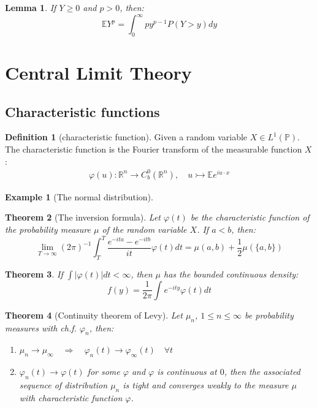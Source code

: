 \documentclass[a4paper,11pt]{book}
\newtheorem{theorem}{Theorem}[section]
\newtheorem{lemma}[theorem]{Lemma}
\theoremstyle{definition}
\newtheorem{definition}{Definition}[section]
\newtheorem*{example}{Example}
\theoremstyle{remark}
\begin{document}
\begin{lemma}
	If $Y\geq 0$ and $p >0$, then:
	\begin{equation*}
		\mathbb{E} Y^p = \int_{0}^\infty p y^{p-1} P(Y > y) dy
	\end{equation*}
\end{lemma}



\section{Central Limit Theory}
\subsection{Characteristic functions}
\begin{definition}[characteristic function]
	Given a random variable $X \in L^1(\mathbb{P}) $. The characteristic function is the Fourier transform of the measurable function $X$:
	\begin{align*}
		\varphi(u): \mathbb{R}^n \rightarrow C^0_b(\mathbb{R}^n), \quad u \rightarrowtail \mathbb{E}e^{iu \cdot x}
	\end{align*}
\end{definition}

\begin{example}[The normal distribution]
\end{example}



\begin{theorem}[The inversion formula]
	Let $\varphi(t)$ be the characteristic function of the probability measure $\mu$ of the random variable $X$. If $a<b$, then:
	\begin{equation*}
		\lim_{T \rightarrow \infty} (2\pi)^{-1} \int^T_T \frac{e^{-ita} - e^{-itb}}{it} \varphi(t) dt = \mu(a, b) + \frac{1}{2} \mu(\{a, b\})
	\end{equation*}
\end{theorem}

\begin{theorem}
	If $\int |\varphi(t)| dt < \infty$, then $\mu$ has the bounded continuous density:
	\begin{equation*}
		f(y) = \frac{1}{2\pi} \int e^{-ity} \varphi(t) dt
	\end{equation*}
\end{theorem}

\begin{theorem}[Continuity theorem of Levy]
	Let $\mu_n$, $1\leq n \leq \infty$ be probability measures with ch.f. $\varphi_n$, then:
	\begin{enumerate}
		\item $\mu_n \rightarrow \mu_\infty \quad \Rightarrow \quad \varphi_n(t) \rightarrow \varphi_\infty(t) \quad \forall t$
		\item $\varphi_n(t) \rightarrow \varphi(t)$ for some $\varphi$ and $\varphi$ is continuous at $0$, then the associated sequence of distribution $\mu_n$ is tight and converges weakly to the measure $\mu$ with characteristic function $\varphi$. 
	\end{enumerate}
\end{theorem}
\end{document}

